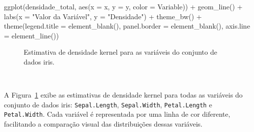 \documentclass[
  a4paperpaper,
]{article}
\newenvironment{Shaded}{\begin{snugshade}}{\end{snugshade}}
\newcommand{\AttributeTok}[1]{\textcolor[rgb]{0.40,0.45,0.13}{#1}}
\newcommand{\FunctionTok}[1]{\textcolor[rgb]{0.28,0.35,0.67}{#1}}
\newcommand{\NormalTok}[1]{\textcolor[rgb]{0.00,0.23,0.31}{#1}}
\newcommand{\SpecialCharTok}[1]{\textcolor[rgb]{0.37,0.37,0.37}{#1}}
\newcommand{\StringTok}[1]{\textcolor[rgb]{0.13,0.47,0.30}{#1}}
\begin{document}
\begin{Shaded}
\begin{Highlighting}[]
\FunctionTok{ggplot}\NormalTok{(densidade\_total, }\FunctionTok{aes}\NormalTok{(}\AttributeTok{x =}\NormalTok{ x, }\AttributeTok{y =}\NormalTok{ y, }\AttributeTok{color =}\NormalTok{ Variable)) }\SpecialCharTok{+}
  \FunctionTok{geom\_line}\NormalTok{() }\SpecialCharTok{+}
  \FunctionTok{labs}\NormalTok{(}\AttributeTok{x =} \StringTok{"Valor da Variável"}\NormalTok{,}
       \AttributeTok{y =} \StringTok{"Densidade"}\NormalTok{) }\SpecialCharTok{+}
  \FunctionTok{theme\_bw}\NormalTok{() }\SpecialCharTok{+}
  \FunctionTok{theme}\NormalTok{(}\AttributeTok{legend.title =} \FunctionTok{element\_blank}\NormalTok{(),}
        \AttributeTok{panel.border =} \FunctionTok{element\_blank}\NormalTok{(),}
        \AttributeTok{axis.line =} \FunctionTok{element\_line}\NormalTok{())}
\end{Highlighting}
\end{Shaded}

\begin{figure}[H]


\caption{\label{fig-densidadeiris}Estimativa de densidade kernel para as
variáveis do conjunto de dados iris.}

\end{figure}%

~

A Figura~\ref{fig-densidadeiris} exibe as estimativas de densidade
kernel para todas as variáveis do conjunto de dados iris:
\texttt{Sepal.Length}, \texttt{Sepal.Width}, \texttt{Petal.Length} e
\texttt{Petal.Width}. Cada variável é representada por uma linha de cor
diferente, facilitando a comparação visual das distribuições dessas
variáveis.
\end{document}
